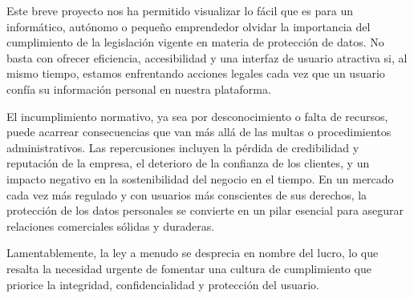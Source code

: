 Este breve proyecto nos ha permitido visualizar lo fácil que es para un informático, autónomo o pequeño emprendedor olvidar la importancia del cumplimiento de la legislación vigente en materia de protección de datos. No basta con ofrecer eficiencia, accesibilidad y una interfaz de usuario atractiva si, al mismo tiempo, estamos enfrentando acciones legales cada vez que un usuario confía su información personal en nuestra plataforma.

El incumplimiento normativo, ya sea por desconocimiento o falta de recursos, puede acarrear consecuencias que van más allá de las multas o procedimientos administrativos. Las repercusiones incluyen la pérdida de credibilidad y reputación de la empresa, el deterioro de la confianza de los clientes, y un impacto negativo en la sostenibilidad del negocio en el tiempo. En un mercado cada vez más regulado y con usuarios más conscientes de sus derechos, la protección de los datos personales se convierte en un pilar esencial para asegurar relaciones comerciales sólidas y duraderas.

Lamentablemente, la ley a menudo se desprecia en nombre del lucro, lo que resalta la necesidad urgente de fomentar una cultura de cumplimiento que priorice la integridad, confidencialidad y protección del usuario.